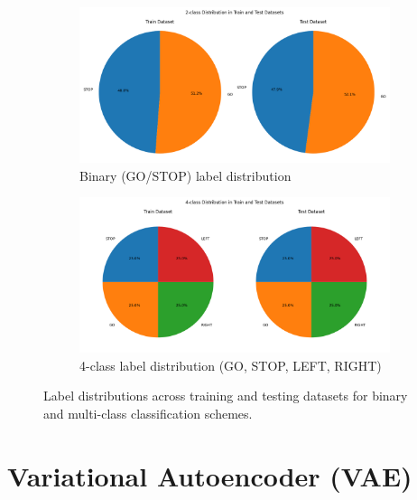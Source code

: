 \begin{figure}[htbp]
    \centering
    \begin{subfigure}{0.48\textwidth}
        \centering
        \includegraphics[width=\linewidth]{img/dataset/2class_distribution.png}
        \caption{Binary (GO/STOP) label distribution\vphantom{g}}
        \label{fig:binary_class_distribution}
    \end{subfigure}
    \hfill
    \begin{subfigure}{0.5\textwidth}
        \centering
        \includegraphics[width=\linewidth]{img/dataset/4class_distribution.png}
        \caption{4-class label distribution (GO, STOP, LEFT, RIGHT)}
        \label{fig:class_distribution_pie}
    \end{subfigure}
    \caption{Label distributions across training and testing datasets for binary and multi-class classification schemes.}
    \label{fig:label_distribution_combined}
\end{figure}





\section{Variational Autoencoder (VAE)} \label{sec:vae}

